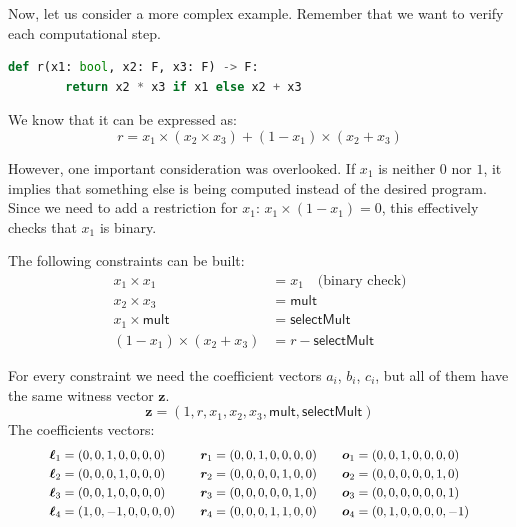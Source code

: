 \documentclass[../../book.tex]{subfiles}
\begin{document}
\begin{example}
    Now, let us consider a more complex example. Remember that we want to verify each computational step.

    \begin{lstlisting}[language=Python,numbers=none]
    def r(x1: bool, x2: F, x3: F) -> F:
        return x2 * x3 if x1 else x2 + x3
    \end{lstlisting}

    We know that it can be expressed as:
    \[ r = x_1 \times (x_2 \times x_3) + (1 - x_1) \times (x_2 + x_3) \]

    However, one important consideration was overlooked. If $x_1$ is neither $0$ nor $1$, it implies
    that something else is being computed instead of the desired program. Since we need to add a
    restriction for $x_1$: $x_1 \times (1 - x_1) = 0$, this effectively checks that $x_1$ is binary.

    The following constraints can be built:
    \begin{align*}
        x_1 \times x_1 &= x_1 \quad \text{(binary check)} \tag{1} \\
        x_2 \times x_3 &= \mathsf{mult} \tag{2} \\
        x_1 \times \mathsf{mult} &= \mathsf{selectMult} \tag{3} \\
        (1 - x_1) \times (x_2 + x_3) &= r - \mathsf{selectMult} \tag{4}
    \end{align*}

    For every constraint we need the coefficient vectors $a_i$, $b_i$, $c_i$, but all of them have
    the same witness vector $\mathbf{z}$.
    \[ \mathbf{z} = (1, r, x_1, x_2, x_3, \mathsf{mult}, \mathsf{selectMult}) \]
    The coefficients vectors:
    \begin{equation*}            
    \scalebox{0.9}{$
        \begin{aligned}
            \boldsymbol{\ell}_1 &= (0, 0, 1, 0, 0, 0, 0) & \quad \boldsymbol{r}_1 &= (0, 0, 1, 0, 0, 0, 0) & \quad \boldsymbol{o}_1 &= (0, 0, 1, 0, 0, 0, 0) \\
            \boldsymbol{\ell}_2 &= (0, 0, 0, 1, 0, 0, 0) & \quad \boldsymbol{r}_2 &= (0, 0, 0, 0, 1, 0, 0) & \quad \boldsymbol{o}_2 &= (0, 0, 0, 0, 0, 1, 0) \\
            \boldsymbol{\ell}_3 &= (0, 0, 1, 0, 0, 0, 0) & \quad \boldsymbol{r}_3 &= (0, 0, 0, 0, 0, 1, 0) & \quad \boldsymbol{o}_3 &= (0, 0, 0, 0, 0, 0, 1) \\
            \boldsymbol{\ell}_4 &= (1, 0, -1, 0, 0, 0, 0) & \quad \boldsymbol{r}_4 &= (0, 0, 0, 1, 1, 0, 0) & \quad \boldsymbol{o}_4 &= (0, 1, 0, 0, 0, 0, -1)
        \end{aligned}
    $}
    \end{equation*}


\end{example}
\end{document}

